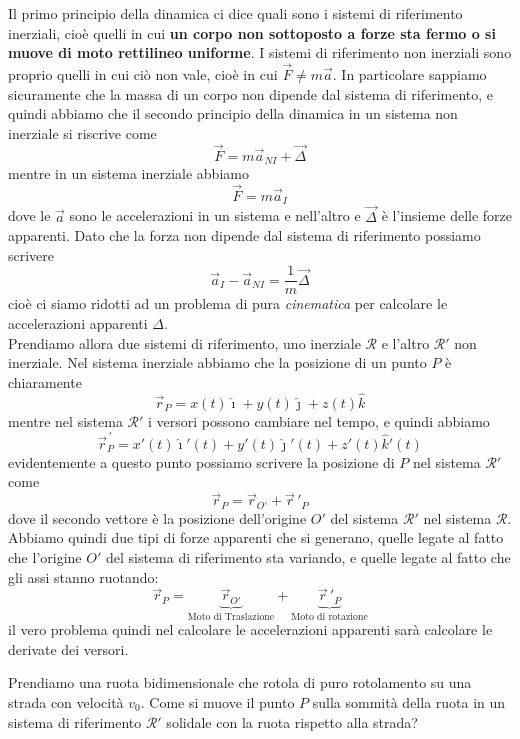 \documentclass[11pt]{scrartcl}
\newcommand{\ihat}{\hat{\imath}}
\newcommand{\jhat}{\hat{\jmath}}
\newcommand{\khat}{\hat{k}}
\newcommand{\posit}{\vec{r}}
\begin{document}
	Il primo principio della dinamica ci dice quali sono i sistemi di riferimento inerziali, cioè quelli in cui \textbf{un corpo non sottoposto a forze sta fermo o si muove di moto rettilineo uniforme}. I sistemi di riferimento non inerziali sono proprio quelli in cui ciò non vale, cioè in cui $\vec{F}\ne m\vec{a}$. In particolare sappiamo sicuramente che la massa di un corpo non dipende dal sistema di riferimento, e quindi abbiamo che il secondo principio della dinamica in un sistema non inerziale si riscrive come
	$$\vec{F}=m\vec{a}_{NI}+\vec{\Delta}$$
	mentre in un sistema inerziale abbiamo
	$$\vec{F}=m\vec{a}_{I}$$
	dove le $\vec{a}$ sono le accelerazioni in un sistema e nell'altro e $\vec{\Delta}$ è l'insieme delle forze apparenti. Dato che la forza non dipende dal sistema di riferimento possiamo scrivere
	$$\vec{a}_I-\vec{a}_{NI}=\frac{1}{m}\vec{\Delta}$$
	cioè ci siamo ridotti ad un problema di pura \textit{cinematica} per calcolare le accelerazioni apparenti $\Delta$. \\
	Prendiamo allora due sistemi di riferimento, uno inerziale $\mathcal{R}$ e l'altro $\mathcal{R}'$ non inerziale. Nel sistema inerziale abbiamo che la posizione di un punto $P$ è chiaramente
	$$\posit_P=x(t)\ihat+y(t)\jhat+z(t)\khat$$
	mentre nel sistema $\mathcal{R}'$ i versori possono cambiare nel tempo, e quindi abbiamo
	$$\posit^{\,'}_P=x'(t)\ihat'(t)+y'(t)\jhat'(t)+z'(t)\khat'(t)$$
	evidentemente a questo punto possiamo scrivere la posizione di $P$ nel sistema $\mathcal{R}'$ come
	$$\posit_P=\posit_{O'}+\posit\,'_P$$
	dove il secondo vettore è la posizione dell'origine $O'$ del sistema $\mathcal{R}'$ nel sistema $\mathcal{R}$. Abbiamo quindi due tipi di forze apparenti che si generano, quelle legate al fatto che l'origine $O'$ del sistema di riferimento sta variando, e quelle legate al fatto che gli assi stanno ruotando:
	$$\posit_P=\underset{\text{Moto di Traslazione}}{\underbrace{\posit_{O'}}}+\underset{\text{Moto di rotazione}}{\underbrace{\posit\,'_P}}$$
	il vero problema quindi nel calcolare le accelerazioni apparenti sarà calcolare le derivate dei versori.
	\begin{example}[Ruota]
		Prendiamo una ruota bidimensionale che rotola di puro rotolamento su una strada con velocità $v_0$. Come si muove il punto $P$ sulla sommità della ruota in un sistema di riferimento $\mathcal{R}'$ solidale con la ruota rispetto alla strada?
	\end{example}
\end{document}

